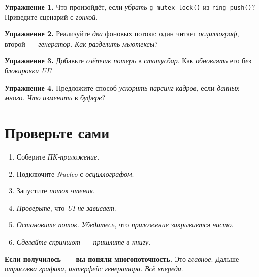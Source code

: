\begin{exercisebox}
\textbf{Упражнение 1.} Что произойдёт, если \emph{убрать}
\texttt{g\_mutex\_lock()} из \texttt{ring\_push()}? Приведите
сценарий с \emph{гонкой}.
\end{exercisebox}

\begin{exercisebox}
\textbf{Упражнение 2.} Реализуйте \emph{два} фоновых потока:
один читает \emph{осциллограф}, второй~--- \emph{генератор}.
\emph{Как} \emph{разделить} \emph{мьютексы}?
\end{exercisebox}

\begin{exercisebox}
\textbf{Упражнение 3.} Добавьте \emph{счётчик} \emph{потерь}
в \emph{статусбар}. Как \emph{обновлять} его \emph{без}
\emph{блокировки} \emph{UI}?
\end{exercisebox}

\begin{exercisebox}
\textbf{Упражнение 4.} Предложите способ \emph{ускорить}
\emph{парсинг} \emph{кадров}, если \emph{данных} \emph{много}.
\emph{Что} \emph{изменить} в \emph{буфере}?
\end{exercisebox}

\section{Проверьте сами}
\label{sec:pc-check}

\begin{enumerate}
    \item Соберите \emph{ПК-приложение}.
    \item Подключите \emph{Nucleo} с \emph{осциллографом}.
    \item Запустите \emph{поток} \emph{чтения}.
    \item \emph{Проверьте}, что \emph{UI} \emph{не} \emph{зависает}.
    \item \emph{Остановите} \emph{поток}. \emph{Убедитесь}, что
          \emph{приложение} \emph{закрывается} \emph{чисто}.
    \item \emph{Сделайте} \emph{скриншот}~--- \emph{пришлите}
          \emph{в} \emph{книгу}.
\end{enumerate}

\begin{ideabox}
\textbf{Если получилось~--- вы поняли многопоточность.}
Это \emph{главное}. Дальше~--- \emph{отрисовка} \emph{графика},
\emph{интерфейс} \emph{генератора}. \emph{Всё} \emph{впереди}.
\end{ideabox}

